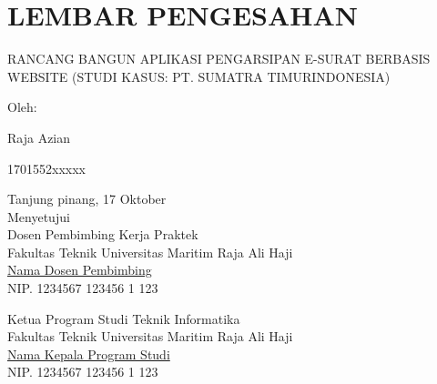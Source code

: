 \chapter*{\centering LEMBAR PENGESAHAN}

\thispagestyle{empty}


\begin{center}
    RANCANG BANGUN APLIKASI PENGARSIPAN E-SURAT BERBASIS WEBSITE (STUDI KASUS: PT. SUMATRA TIMURINDONESIA)
\end{center}

\vspace{1cm}

\begin{center}
    Oleh:
    \begin{multicols}{2}
        {Raja Azian}

        {1701552xxxxx}
    \end{multicols}

    \vspace{1cm}

    Tanjung pinang, 17 Oktober \the\year{}\\
    Menyetujui\\
    Dosen Pembimbing Kerja Praktek \\
    Fakultas Teknik Universitas Maritim Raja Ali Haji \\
    \vspace{2cm}
    \underline{ Nama Dosen Pembimbing } \\
    NIP. 1234567 123456 1 123 \\

    \vspace{2.75cm}

    Ketua Program Studi Teknik Informatika \\
    Fakultas Teknik Universitas Maritim Raja Ali Haji \\
    \vspace{2cm}
    \underline{ Nama Kepala Program Studi } \\
    NIP. 1234567 123456 1 123 \\
\end{center}
\newpage